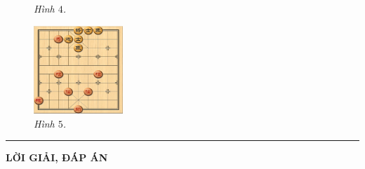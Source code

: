 \begin{multicols}{2}
\begin{figure}[H]
				\caption{\small\textit{\color{gocco}Hình $4$.}}
				\vspace*{-5pt}
			\end{figure}
		\begin{figure}[H]
			\vspace*{5pt}
			\centering
			\captionsetup{labelformat= empty, justification=centering}
			\includegraphics[width= 0.3\textwidth]{5}
			\caption{\small\textit{\color{gocco}Hình $5$.}}
			\vspace*{-10pt}
		\end{figure}
	\end{multicols}
\vspace*{-10pt}
\rule{1\textwidth}{0.1pt}
	\begin{center}
		\LARGE{\textbf{\color{gocco}LỜI GIẢI, ĐÁP ÁN}}
	\end{center}
